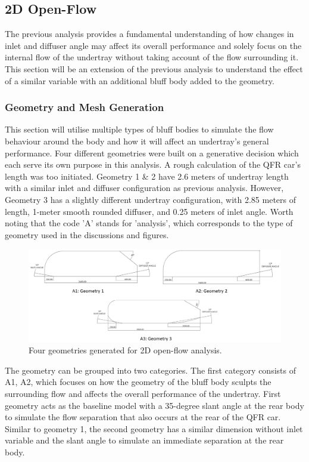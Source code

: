 

\subsection{2D Open-Flow}
The previous analysis provides a fundamental understanding of how changes in inlet and diffuser angle may affect its overall performance and solely focus on the internal flow of the undertray without taking account of the flow surrounding it. This section will be an extension of the previous analysis to understand the effect of a similar variable with an additional bluff body added to the geometry. 

\subsubsection{Geometry and Mesh Generation}
This section will utilise multiple types of bluff bodies to simulate the flow behaviour around the body and how it will affect an undertray's general performance. Four different geometries were built on a generative decision which each serve its own purpose in this analysis. A rough calculation of the QFR car's length was too initiated. Geometry 1 \& 2 have 2.6 meters of undertray length with a similar inlet and diffuser configuration as previous analysis. However, Geometry 3 has a slightly different undertray configuration, with 2.85 meters of length, 1-meter smooth rounded diffuser, and 0.25 meters of inlet angle. Worth noting that the code 'A' stands for 'analysis', which corresponds to the type of geometry used in the discussions and figures.

\begin{figure}[!ht]
    \centering
    \includegraphics[scale = 0.5]{Figures/2D_OF/2D_OF_GEOM.png}
    \caption{Four geometries generated for 2D open-flow analysis.}
    \label{fig:2D_OF_GEOM}
\end{figure}

\noindent The geometry can be grouped into two categories. The first category consists of A1, A2, which focuses on how the geometry of the bluff body sculpts the surrounding flow and affects the overall performance of the undertray. First geometry acts as the baseline model with a 35-degree slant angle at the rear body to simulate the flow separation that also occurs at the rear of the QFR car. Similar to geometry 1, the second geometry has a similar dimension without inlet variable and the slant angle to simulate an immediate separation at the rear body.

